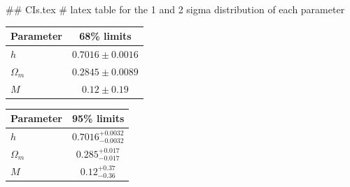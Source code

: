 ## CIs.tex
# latex table for the 1 and 2 sigma distribution of each parameter

\begin{tabular} { l  c}
 Parameter &  68\% limits\\
\hline
{\boldmath$h              $} & $0.7016\pm 0.0016          $\\
{\boldmath$\Omega_m       $} & $0.2845\pm 0.0089          $\\
{\boldmath$M              $} & $0.12\pm 0.19              $\\
\hline
\end{tabular}

\begin{tabular} { l  c}
 Parameter &  95\% limits\\
\hline
{\boldmath$h              $} & $0.7016^{+0.0032}_{-0.0032}$\\
{\boldmath$\Omega_m       $} & $0.285^{+0.017}_{-0.017}   $\\
{\boldmath$M              $} & $0.12^{+0.37}_{-0.36}      $\\
\hline
\end{tabular}
